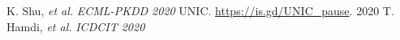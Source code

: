 {\footnotesize 
\begin{twobibliography}{99}
    \setlength{\parskip}{0cm}
    \setlength{\itemsep}{0cm}
     K. Shu, \textit{et al.} \textit{ECML-PKDD 2020}
     UNIC. \url{https://is.gd/UNIC_pause}. 2020
     T. Hamdi, \textit{et al.} \textit{ICDCIT 2020}
\end{twobibliography}
}


